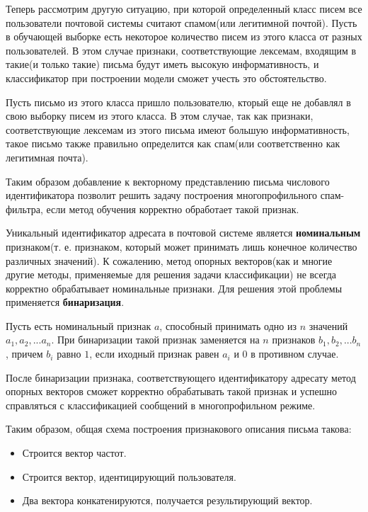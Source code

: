 Теперь рассмотрим другую ситуацию, при которой определенный класс писем все пользователи почтовой системы считают спамом(или легитимной почтой). Пусть в обучающей выборке есть некоторое количество писем из этого класса от разных пользователей. В этом случае признаки, соответствующие лексемам, входящим в такие(и только такие) письма будут иметь высокую информативность, и классификатор при построении модели сможет учесть это обстоятельство.

Пусть письмо из этого класса пришло пользователю, кторый еще не добавлял в свою выборку писем из этого класса. В этом случае, так как признаки, соответствующие лексемам из этого письма имеют большую информативность, такое письмо также правильно определится как спам(или соответственно как легитимная почта).

Таким образом добавление к векторному представлению письма числового идентификатора позволит решить задачу построения многопрофильного спам-фильтра, если метод обучения корректно обработает такой признак. 

Уникальный идентификатор адресата в почтовой системе является \textbf{номинальным} признаком(т. е. признаком, который может принимать лишь конечное количество различных значений). К сожалению, метод опорных векторов(как и многие другие методы, применяемые для решения задачи классификации) не всегда корректно обрабатывает номинальные признаки.\cite{YURYSVM} Для решения этой проблемы применяется \textbf{бинаризация}.

Пусть есть номинальный признак $a$, способный принимать одно из $n$ значений $a_1, a_2, ... a_n$. При бинаризации такой признак заменяется на $n$ признаков $b_1, b_2, ... b_n$, причем $b_i$ равно $1$, если иходный признак равен $a_i$ и $0$ в противном случае.

После бинаризации признака, соответствующего идентификатору адресату метод опорных векторов сможет корректно обрабатывать такой признак и успешно справляться с классификацией сообщений в многопрофильном режиме.

Таким образом, общая схема построения признакового описания письма такова:

\begin{itemize}
	\item Строится вектор частот.
	\item Строится вектор, идентицирующий пользователя.
	\item Два вектора конкатенируются, получается результирующий вектор.
\end{itemize}

